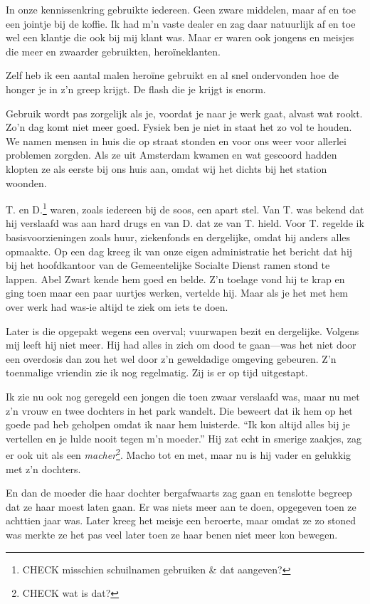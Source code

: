 \documentclass[12pt,twoside, openright]{memoir}
\begin{document}
In onze kennissenkring gebruikte iedereen. Geen zware middelen, maar af en toe een jointje bij de koffie. Ik had m’n vaste dealer en zag daar natuurlijk af en toe wel een klantje die ook bij mij klant was. Maar er waren ook jongens en meisjes die meer en zwaarder gebruikten, heroïneklanten. 

Zelf heb ik een aantal malen heroïne gebruikt en al snel ondervonden hoe de honger je in z’n greep krijgt. De flash die je krijgt is enorm.

Gebruik wordt pas zorgelijk als je, voordat je naar je werk gaat, alvast wat rookt. Zo’n dag komt niet meer goed. Fysiek ben je niet in staat het zo vol te houden. We namen mensen in huis die op straat stonden en voor ons weer voor allerlei problemen zorgden. Als ze uit Amsterdam kwamen en wat gescoord hadden klopten ze als eerste bij ons huis aan, omdat wij het dichts bij het station woonden. 

T. en D.\footnote{CHECK misschien schuilnamen gebruiken \& dat aangeven?} waren, zoals iedereen bij de soos, een apart stel. Van T. was bekend dat hij verslaafd was aan hard drugs en van D. dat ze van T. hield. Voor T. regelde ik basisvoorzieningen zoals huur, ziekenfonds en dergelijke, omdat hij anders alles opmaakte. Op een dag kreeg ik van onze eigen administratie het bericht dat hij bij het hoofdkantoor van de Gemeentelijke Socialte Dienst ramen stond te lappen. Abel Zwart kende hem goed en belde. Z’n toelage vond hij te krap en ging toen maar een paar uurtjes werken, vertelde hij. Maar als je het met hem over werk had was-ie altijd te ziek om iets te doen. 

Later is die opgepakt wegens een overval; vuurwapen bezit en dergelijke. Volgens mij leeft hij niet meer. Hij had alles in zich om dood te gaan---was het niet door een overdosis dan zou het wel door z’n geweldadige omgeving gebeuren. Z’n toenmalige vriendin zie ik nog regelmatig. Zij is er op tijd uitgestapt.

Ik zie nu ook nog geregeld een jongen die toen zwaar verslaafd was, maar nu met z’n vrouw en twee dochters in het park wandelt. Die beweert dat ik hem op het goede pad heb geholpen omdat ik naar hem luisterde. ``Ik kon altijd alles bij je vertellen en je lulde nooit tegen m’n moeder.'' Hij zat echt in smerige zaakjes, zag er ook uit als een \emph{macher}\footnote{CHECK wat is dat?}. Macho tot en met, maar nu is hij vader en gelukkig met z’n dochters. 

En dan de moeder die haar dochter bergafwaarts zag gaan en tenslotte begreep dat ze haar moest laten gaan. Er was niets meer aan te doen, opgegeven toen ze achttien jaar was. Later kreeg het meisje een beroerte, maar omdat ze zo stoned was merkte ze het pas veel later toen ze haar benen niet meer kon bewegen. 
\end{document}
